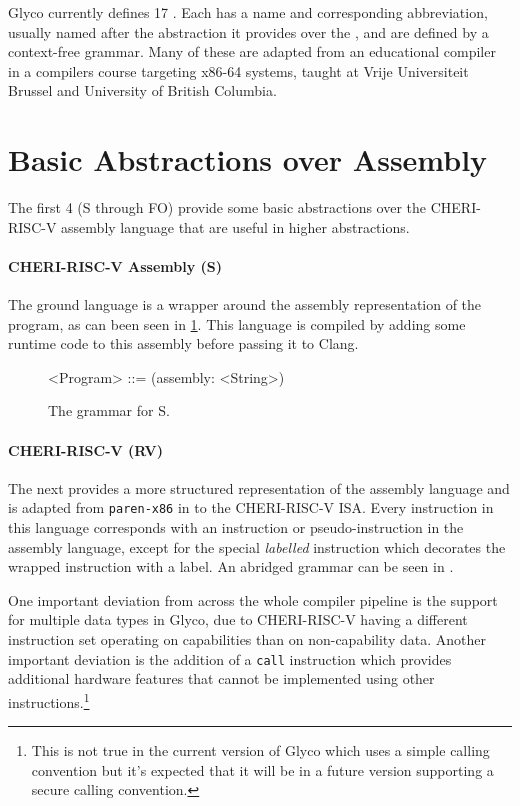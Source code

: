 \documentclass[main.tex]{subfiles}
\begin{document}
Glyco currently defines 17 \ils{}. Each \il{} has a name and corresponding abbreviation, usually named after the abstraction it provides over the \lowerlang{}, and are defined by a context-free grammar. Many of these \ils{} are adapted from an educational compiler in a compilers course targeting x86-64 systems, taught at Vrije Universiteit Brussel \cite{:compcourse} and University of British Columbia.

\section{Basic Abstractions over Assembly}

The first 4 \ils{} (S through FO) provide some basic abstractions over the CHERI-RISC-V assembly language that are useful in higher abstractions.

\paragraph{CHERI-RISC-V Assembly (S)} The ground language is a wrapper around the assembly representation of the program, as can been seen in \cref{bnf:s}. This language is compiled by adding some runtime code to this assembly before passing it to Clang.
\begin{figure}[ht]
	\begin{grammar}
		<Program> ::= (assembly: <String>)
	\end{grammar}
	\caption{The grammar for S.}
	\label{bnf:s}
\end{figure}

\paragraph{CHERI-RISC-V (RV)} The next \il{} provides a more structured representation of the assembly language and is adapted from \texttt{paren-x86} in \cite{:compcourse} to the CHERI-RISC-V ISA. Every instruction in this language corresponds with an instruction or pseudo-instruction in the assembly language, except for the special \emph{labelled} instruction which decorates the wrapped instruction with a label. An abridged grammar can be seen in .

One important deviation from \cite{:compcourse} across the whole compiler pipeline is the support for multiple data types in Glyco, due to CHERI-RISC-V having a different instruction set operating on capabilities than on non-capability data. Another important deviation is the addition of a \texttt{call} instruction which provides additional hardware features that cannot be implemented using other instructions.\footnote{This is not true in the current version of Glyco which uses a simple calling convention but it's expected that it will be in a future version supporting a secure calling convention.}
\end{document}
